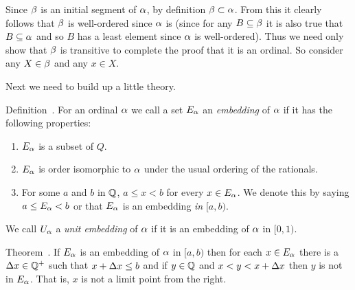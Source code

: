\begin{solution}
{        Since $\beta$ is an initial segment of $\alpha$, by definition $\beta \subset \alpha$.
        From this it clearly follows that $\beta$ is well-ordered since $\alpha$ is (since for any $B \subseteq \beta$ it is also true that $B \subseteq \alpha$ and so $B$ has a least element since $\alpha$ is well-ordered).
        Thus we need only show that $\beta$ is transitive to complete the proof that it is an ordinal.
        So consider any $X \in \beta$ and any $x \in X$. \qedsymbol
    }

    Next we need to build up a little theory.
    
    \begin{statement}{Definition~\ex.}
        For an ordinal $\alpha$ we call a set $E_\alpha$ an \emph{embedding} of $\alpha$ if it has the following properties:
        \begin{enumerate}
            \item $E_\alpha$ is a subset of $Q$.
            \item $E_\alpha$ is order isomorphic to $\alpha$ under the usual ordering of the rationals.
            \item For some $a$ and $b$ in $\mathbb{Q}$, $a \leq x < b$ for every $x \in E_\alpha$. We denote this by saying $a \leq E_\alpha < b$ or that $E_\alpha$ is an embedding \emph{in} $[a,b)$.
            \end{enumerate}
            We call $U_\alpha$ a \emph{unit embedding} of $\alpha$ if it is an embedding of $\alpha$ in $[0,1)$.
    \end{statement}

    \begin{statement}{Theorem~\ex.}
        If $E_\alpha$ is an embedding of $\alpha$ in $[a, b)$ then for each $x \in E_\alpha$ there is a $\Delta x \in \mathbb{Q}^+$ such that $x + \Delta x \leq b$ and if $y \in \mathbb{Q}$ and $x < y < x+\Delta x$ then $y$ is not in $E_\alpha$.
        That is, $x$ is not a limit point from the right.
    \end{statement}

\end{solution}
